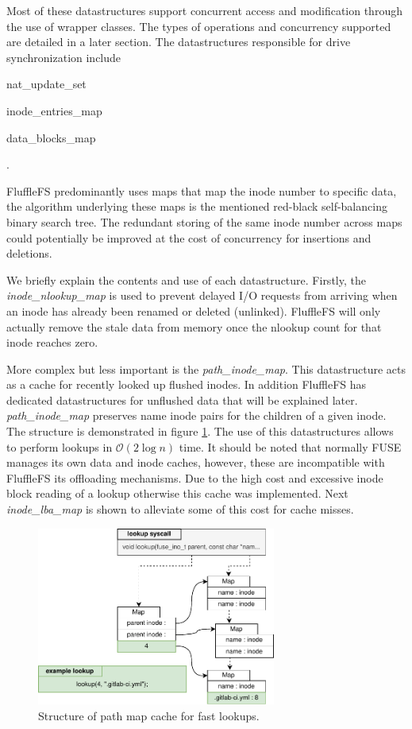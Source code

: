 Most of these datastructures support concurrent access and modification through
the use of wrapper classes. The types of operations and concurrency supported
are detailed in a later section. The datastructures responsible for drive
synchronization include \begin{enumerate*} \item nat\_update\_set 
    \item inode\_entries\_map \item data\_blocks\_map \end{enumerate*}.

FluffleFS predominantly uses maps that map the inode number to specific data,
the algorithm underlying these maps is the mentioned red-black self-balancing
binary search tree. The redundant storing of the same inode number across
maps could potentially be improved at the cost of concurrency for insertions
and deletions.

We briefly explain the contents and use of each datastructure. Firstly, the
\textit{inode\_nlookup\_map} is used to prevent delayed I/O requests from
arriving when an inode has already been renamed or deleted (unlinked). FluffleFS
will only actually remove the stale data from memory once the nlookup count for
that inode reaches zero.

More complex but less important is the \textit{path\_inode\_map}. This
datastructure acts as a cache for recently looked up flushed inodes. In addition
FluffleFS has dedicated datastructures for unflushed data that will be explained
later. \textit{path\_inode\_map} preserves name inode pairs for the children of
a given inode. The structure is demonstrated in figure
\ref{figure:flufflepathmap}. The use of this datastructures allows to perform
lookups in $\mathcal{O}(2 \log n)$ time. It should be noted that normally FUSE
manages its own data and inode caches, however, these are incompatible with
FluffleFS its offloading mechanisms. Due to the high cost and excessive inode
block reading of a lookup
otherwise this cache was implemented. Next \textit{inode\_lba\_map} is shown to
alleviate some of this cost for cache misses.

\begin{figure}[h!]
    \centering
	\includegraphics[width=0.7\textwidth]{resources/images/fluffle-path-map.pdf}
	\caption{Structure of path map cache for fast lookups.}
    \label{figure:flufflepathmap}
\end{figure}

